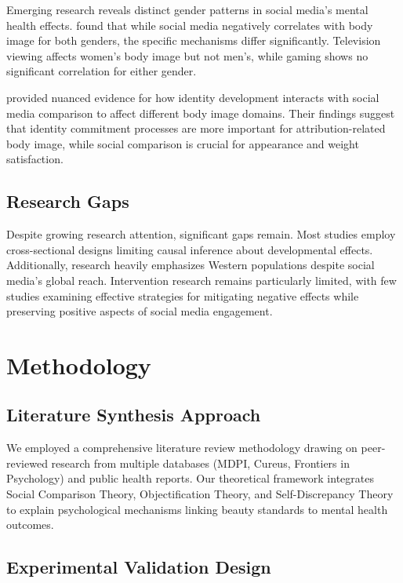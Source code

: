\documentclass{article}
\begin{document}
Emerging research reveals distinct gender patterns in social media's mental health effects. \citet{zhou2024} found that while social media negatively correlates with body image for both genders, the specific mechanisms differ significantly. Television viewing affects women's body image but not men's, while gaming shows no significant correlation for either gender.

\citet{croatian2023} provided nuanced evidence for how identity development interacts with social media comparison to affect different body image domains. Their findings suggest that identity commitment processes are more important for attribution-related body image, while social comparison is crucial for appearance and weight satisfaction.

\subsection{Research Gaps}

Despite growing research attention, significant gaps remain. Most studies employ cross-sectional designs limiting causal inference about developmental effects. Additionally, research heavily emphasizes Western populations despite social media's global reach. Intervention research remains particularly limited, with few studies examining effective strategies for mitigating negative effects while preserving positive aspects of social media engagement.

\section{Methodology}

\subsection{Literature Synthesis Approach}

We employed a comprehensive literature review methodology drawing on peer-reviewed research from multiple databases (MDPI, Cureus, Frontiers in Psychology) and public health reports. Our theoretical framework integrates Social Comparison Theory, Objectification Theory, and Self-Discrepancy Theory to explain psychological mechanisms linking beauty standards to mental health outcomes.

\subsection{Experimental Validation Design}
\end{document}
